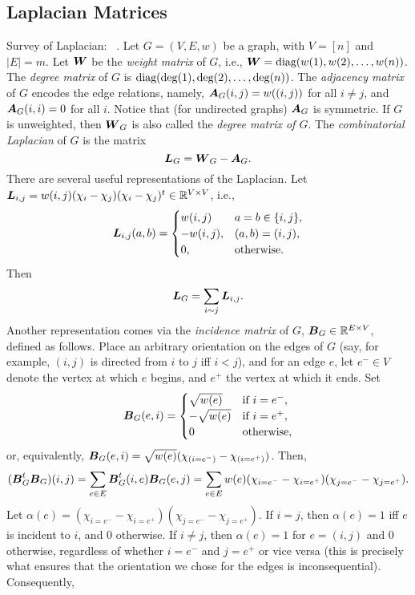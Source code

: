 \subsection{Laplacian Matrices}
Survey of Laplacian: ~\cite{merris1994laplacian}.  
Let $G=(V,E,w)$ be a graph, with $V=[n]$ and $|E|=m$. 
Let $\vb*{W}$ be the \emph{weight matrix} of $G$, i.e., $\vb*{W}=\text{diag}(w(1),w(2),\dots,w(n))$. 
The \emph{degree matrix} of $G$ is $\text{diag}(\deg(1),\deg(2),\dots,\deg(n))$. The \emph{adjacency matrix} of $G$ encodes the edge relations, namely, $\vb*{A}_G(i,j)=w((i,j))$ for all $i\neq j$, and $\vb*{A}_G(i,i)=0$ for all $i$. Notice that (for undirected graphs) $\vb*{A}_G$ is symmetric.  If $G$ is unweighted, then $\vb*{W}_G$ is also called the \emph{degree matrix of $G$}. 
The \emph{combinatorial Laplacian} of $G$ is the matrix 
\[\vb*{L}_G=\vb*{W}_G-\vb*{A}_G.\]
There are several useful representations of the Laplacian. Let $\vb*{L}_{i,j}=w(i,j)(\chi_i-\chi_j) (\chi_i-\chi_j)^t\in \mathbb{R}^{V\times V}$, i.e., 
\[\vb*{L}_{i,j}(a,b)=\begin{cases}
w(i,j)&a=b\in\{i,j\},\\
-w(i,j),&(a,b)=(i,j),\\
0,&\text{otherwise}.
\end{cases}\]
Then 
\begin{equation}
\label{eq:Lsum}
    \vb*{L}_G=\sum_{i\sim j}\vb*{L}_{i,j}.
\end{equation}
Another representation comes via the \emph{incidence matrix} of $G$, $\vb*{B}_G\in \mathbb{R}^{E\times V}$, defined as follows. Place an arbitrary orientation on the edges of $G$ (say, for example, $(i,j)$ is directed from $i$ to $j$ iff $i<j$), and for an edge $e$, let $e^-\in V$ denote the vertex at which $e$ begins, and $e^+$ the vertex at which it ends. Set 
\[\vb*{B}_G(e,i)=\begin{cases}
\sqrt{w(e)}&\text{if }i=e^-,\\
-\sqrt{w(e)}&\text{if }i=e^+,\\
0&\text{otherwise},
\end{cases}\]
or, equivalently, $\vb*{B}_G(e,i) = \sqrt{w(e)}(\chi_{(i=e^-)}-\chi_{(i=e^+)})$. Then,
\begin{equation*}
   ( \vb*{B}_G^t\vb*{B}_G)(i,j)=\sum_{e\in E} \vb*{B}_G^t(i,e)\vb*{B}_G(e,j)=\sum_{e\in E}w(e)(\chi_{i=e^-}-\chi_{i=e^+})(\chi_{j=e^-}-\chi_{j=e^+}).
\end{equation*}
Let $\alpha(e)=(\chi_{i=e^-}-\chi_{i=e^+})(\chi_{j=e^-}-\chi_{j=e^+})$. If $i=j$, then $\alpha(e)=1$ iff $e$ is incident to $i$, and 0 otherwise. If $i\neq j$, then $\alpha(e)=1$ for $e=(i,j)$ and 0 otherwise, regardless of whether $i=e^-$ and $j=e^+$ or vice versa (this is precisely what ensures that the orientation we chose for the edges is inconsequential). Consequently, 
